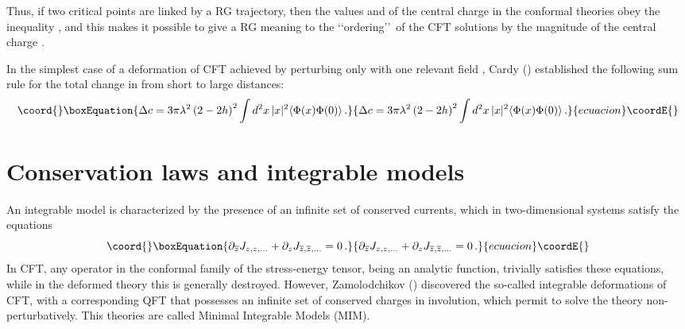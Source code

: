 \documentclass[a4paper,12pt]{report}
\begin{document}
Thus, if two critical points are linked by a RG trajectory, then the values \coordHE{} and \coordHE{} of the central
charge in the conformal theories obey the inequality \coordHE{}, and this makes it possible to give a RG
meaning to the \lq\lq ordering\rq\rq\, of the CFT solutions by the magnitude of the central charge \coordHE{}.

In the simplest case of a deformation of CFT achieved by perturbing only with one relevant field \myHighlight{$\Phi$}\coordHE{}, Cardy
(\cite{Cardysum}) established the following sum rule for the total change in \coordHE{} from short to large distances:
\begin{equation}\coord{}\boxEquation{\label{Cardysum}
\Delta c=3\pi \lambda ^{2}\left(2-2 h \right)^{2}\int d^{2}x\,|x| ^{2}\langle\Phi (x)\Phi (0)\rangle \,.
}{\Delta c=3\pi \lambda ^{2}\left(2-2 h \right)^{2}\int d^{2}x\,|x| ^{2}\langle\Phi (x)\Phi (0)\rangle \,.
}{ecuacion}\coordE{}\end{equation}

\vspace{1cm}

\section{Conservation laws and integrable models}

An integrable model is characterized by the presence of an infinite set of conserved currents, which in
two-dimensional systems satisfy the equations
\begin{equation}\coord{}\boxEquation{
\partial _{\overline{z}}J_{z,z,...}+\partial _{z}J_{\overline{z},\overline{z},...}=0 \,.
}{
\partial _{\overline{z}}J_{z,z,...}+\partial _{z}J_{\overline{z},\overline{z},...}=0 \,.
}{ecuacion}\coordE{}\end{equation}
In CFT, any operator in the conformal family of the stress-energy tensor, being an analytic function, trivially
satisfies these equations, while in the deformed theory this is generally destroyed. However, Zamolodchikov
(\cite{sbrind}) discovered the so-called integrable deformations of CFT, with a corresponding QFT that possesses
an infinite set of conserved charges \coordHE{} in involution, which permit to solve the theory non-perturbatively.
This theories are called Minimal Integrable Models (MIM).
\end{document}
